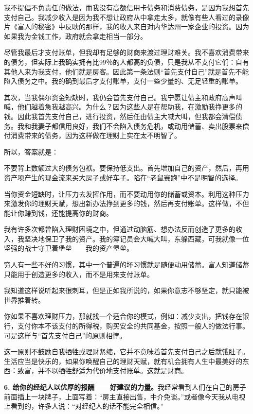 我不提倡不负责任的做法，而我没有高额信用卡债务和消费债务，是因为我想首先支付自己。我减少收入是因为我不想让政府从中拿走太多，就像有些人看过的录像片《富人的秘密》中反映的那样，我的收入来自对内华达州一家企业的投资。因为如果我为金钱工作，政府就会拿走相当一部分。

尽管我最后才支付账单，但我却有足够的财商来渡过理财难关。我不喜欢消费带来的债务，但实际上我确实拥有比99％的人都高的负债，只是我从不支付它们：自有其他人来为我支付，他们就是房客。因此第一条法则“首先支付自己”就是首先不能陷入债务之中。我的确到最后才支付账单，支付一些少量的、无足轻重的账单。

其次，当我偶尔资金短缺时，我仍会首先支付自己。我宁愿让债主和政府高声叫喊，他们越着急我越高兴。为什么？因为这些人是在帮助我，在激励我挣更多的钱。因此我首先支付自己，进行投资，然后任由债主大喊大叫，但我都会清偿债务。我和我妻子都信用良好，我们不会陷入债务危机，或动用储蓄、卖出股票来偿付消费带来的债务，因为这样做在理财上实在太不明智了。

所以，答案就是：

不要背上数额过大的债务包袱。要保持低支出。首先增加自己的资产，然后，再用资产项产生的现金流来买大房子或好车子。陷在“老鼠赛跑”中不是明智的选择。

当你资金短缺时，让压力去发挥作用，而不要动用你的储蓄或资本。利用这种压力来激发你的理财天赋，想出新办法挣到更多的钱，然后再支付账单。这样做，不但能让你赚到钱，还能提高你的财商。

我有许多次都曾陷入理财困境之中，但通过动脑筋、想办法反而创造了更多的收入，我坚决地保卫了我的资产。我的簿记员会大喊大叫，东躲西藏，可我就像一位坚强的战士守卫着堡垒——我的资产堡垒。

穷人有一些不好的习惯，其中一个普遍的坏习惯就是随便动用储蓄。富人知道储蓄只能用于创造更多的收入，而不是用来支付账单。

我知道这样说听起来很刺耳，但是正如我所说的，如果你意志不够坚定，就只能被世界推着转。

你如果不喜欢理财压力，那就找一个适合你的模式，例如：减少支出，把钱存在银行，支付你本不该支付的所得税，购买安全的共同基金，按照一般人的做法行事。可是这样与“首先支付自己”的原则相悖。

这一原则不鼓励自我牺牲或理财紧缩，它并不意味着首先支付自己之后就饿肚子。生活应当是快乐的，如果你唤醒自己的理财天赋，就有机会拥有人生中最美好的东西：致富，并不以牺牲舒适为代价地支付账单。这就是财商。

\textbf{6. 给你的经纪人以优厚的报酬——好建议的力量。}我经常看到人们在自己的房子前面插上一块牌子，上面写着：“房主直接出售，中介免谈。”或者像今天我从电视上看到的，许多人说：“对经纪人的话不能完全相信。”

